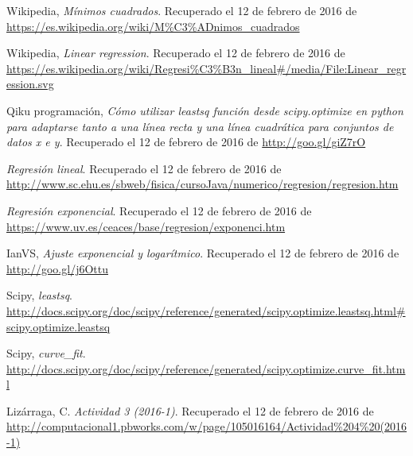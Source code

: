 \documentclass[12pt]{article}
\begin{document}
\begin{thebibliography}{6}

Wikipedia,
\emph{Mínimos cuadrados}. Recuperado el 12 de febrero de 2016 de \url{https://es.wikipedia.org/wiki/M\%C3\%ADnimos_cuadrados}

Wikipedia,
\emph{Linear regression}. Recuperado el 12 de febrero de 2016 de \url{https://es.wikipedia.org/wiki/Regresi\%C3\%B3n_lineal\#/media/File:Linear_regression.svg}

Qiku programación,
\emph{Cómo utilizar leastsq función desde scipy.optimize en python para adaptarse tanto a una línea recta y una línea cuadrática para conjuntos de datos x e y}. Recuperado el 12 de febrero de 2016 de \url{http://goo.gl/giZ7rO}

\emph{Regresión lineal}. Recuperado el 12 de febrero de 2016 de \url{http://www.sc.ehu.es/sbweb/fisica/cursoJava/numerico/regresion/regresion.htm}

\emph{Regresión exponencial}. Recuperado el 12 de febrero de 2016 de \url{https://www.uv.es/ceaces/base/regresion/exponenci.htm}

IanVS,
\emph{Ajuste exponencial y logarítmico}. Recuperado el 12 de febrero de 2016 de 
\url{http://goo.gl/j6Ottu}

Scipy,
\emph{leastsq}. \url{http://docs.scipy.org/doc/scipy/reference/generated/scipy.optimize.leastsq.html#scipy.optimize.leastsq}

Scipy,
\emph{curve\_fit}. \url{http://docs.scipy.org/doc/scipy/reference/generated/scipy.optimize.curve_fit.html}

Lizárraga, C.
\emph{Actividad 3 (2016-1)}. Recuperado el 12 de febrero de 2016 de \url{http://computacional1.pbworks.com/w/page/105016164/Actividad\%204\%20(2016-1)}

\end{thebibliography}
\end{document}
